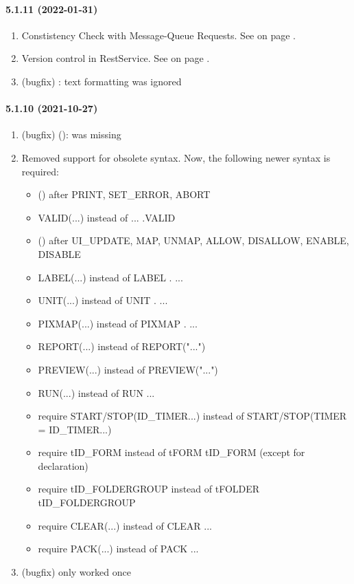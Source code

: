 \paragraph{5.1.11 (2022-01-31)}  %
\begin{enumerate}
\item Constistency Check with Message-Queue Requests.
      See  on page \pageref{dia:jobmessagequeueoption}.
\item Version control in RestService.
      See  on page \pageref{par:restServiceVersionControl}.
\item (bugfix) \NAVIGATOR{}: text formatting was ignored
\end{enumerate}

\paragraph{5.1.10 (2021-10-27)}  %
\begin{enumerate}
\item (bugfix) \NAVIGATOR{} (\DIAGRAM): \STRUCT{} \MENU{} was missing
\item Removed support for obsolete syntax. Now, the following newer syntax is required:
  \begin{itemize}
  \item () after PRINT, SET\_ERROR, ABORT
  \item VALID(...) instead of ... .VALID
  \item () after UI\_UPDATE, MAP, UNMAP, ALLOW, DISALLOW, ENABLE, DISABLE
  \item LABEL(...) instead of LABEL . ...
  \item UNIT(...) instead of UNIT . ...
  \item PIXMAP(...) instead of PIXMAP . ...
  \item REPORT(...) instead of REPORT("...")
  \item PREVIEW(...) instead of PREVIEW("...")
  \item RUN(...) instead of RUN ...
  \item require START/STOP(ID\_TIMER...) instead of START/STOP(TIMER = ID\_TIMER...)
  \item require tID\_FORM instead of tFORM tID\_FORM (except for \MENU declaration)
  \item require tID\_FOLDERGROUP instead of tFOLDER tID\_FOLDERGROUP
  \item require CLEAR(...) instead of CLEAR ...
  \item require PACK(...) instead of PACK ...
  \end{itemize}
\item (bugfix) \ROWSPAN{} only worked once
\end{enumerate}

